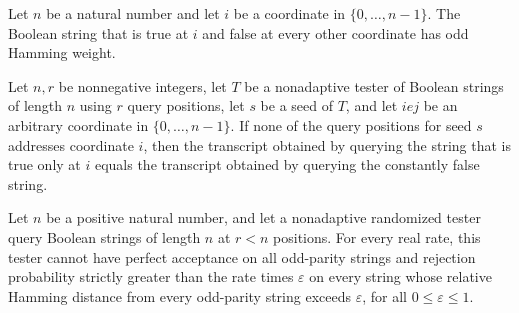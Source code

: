 \begin{theorem}
\label{FABL.singletonTrueString_isOddWeight}
\leanok
{}
Let $n$ be a natural number and let $i$ be a coordinate in $\{0,\ldots,n-1\}$. The
Boolean string that is true at $i$ and false at every other coordinate has odd Hamming
weight.
\end{theorem}

\begin{theorem}
\label{FABL.singletonTrueString_transcript_eq}
\leanok
{}
Let $n,r$ be nonnegative integers, let $T$ be a nonadaptive tester of Boolean strings of
length $n$ using $r$ query positions, let $s$ be a seed of $T$, and let $i
e j$ be an arbitrary coordinate in $\{0,\dots,n-1\}$. If none of the query positions
for seed $s$ addresses coordinate $i$, then the transcript obtained by querying the
string that is true only at $i$ equals the transcript obtained by querying the
constantly false string.
\end{theorem}

\begin{theorem}
\label{FABL.oddWeightString_no_localTester_of_queries_lt}
\leanok
{}
Let $n$ be a positive natural number, and let a nonadaptive randomized tester query
Boolean strings of length $n$ at $r<n$ positions. For every real rate, this tester
cannot have perfect acceptance on all odd-parity strings and rejection probability
strictly greater than the rate times $\varepsilon$ on every string whose relative
Hamming distance from every odd-parity string exceeds $\varepsilon$, for all
$0\le\varepsilon\le1$.
\end{theorem}

